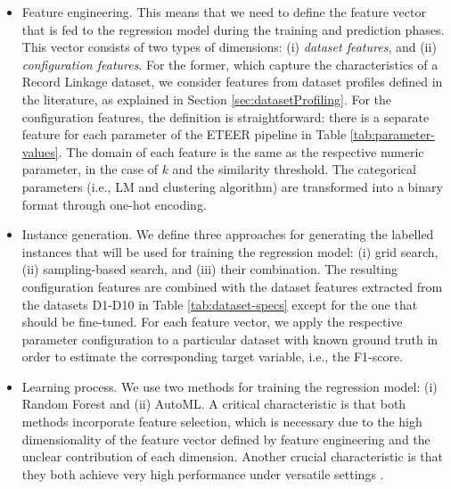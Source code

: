 \begin{itemize}[leftmargin=*]
    \item Feature engineering. This means that we need to define the feature vector that is fed to the regression model during the training and prediction phases. This vector consists of two types of dimensions: (i) \textit{dataset features}, and (ii) \textit{configuration features}. For the former, which capture the characteristics of a Record Linkage dataset, we consider features from dataset profiles defined in the literature, as explained in Section \ref{sec:datasetProfiling}. For the configuration features, the definition is straightforward: there is a separate feature for each parameter of the ETEER pipeline in Table \ref{tab:parameter-values}. The domain of each feature is the same as the respective numeric parameter, in the case of $k$ and the similarity threshold. The categorical parameters (i.e., LM and clustering algorithm) are transformed into a binary format through one-hot encoding. 
    \item Instance generation. We define three approaches for generating the labelled instances that will be used for training the regression model: (i) grid search, (ii) sampling-based search, and (iii) their combination. The resulting configuration features are combined with the dataset features extracted from the datasets D1-D10 in Table \ref{tab:dataset-specs} except for the one that should be fine-tuned. For each feature vector, we apply the respective parameter configuration to a particular dataset with known ground truth in order to estimate the corresponding target variable, i.e., the F1-score. 
    \item Learning process. We use two methods for training the regression model: (i) Random Forest and (ii) AutoML. A critical characteristic is that both methods incorporate feature selection, which is necessary due to the high dimensionality of the feature vector defined by feature engineering and the unclear contribution of each dimension. Another crucial characteristic is that they both achieve very high performance under versatile settings \cite{DBLP:journals/csur/KarmakerHSXZV22,DBLP:journals/bioinformatics/NguyenJGSALJCGM21}.
\end{itemize}


